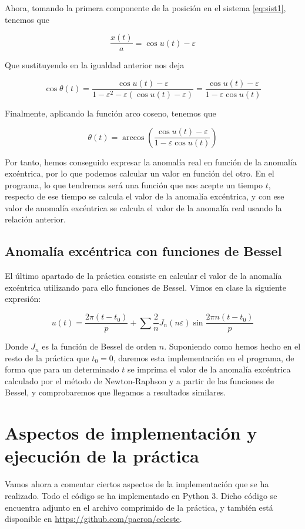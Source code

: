 \documentclass[12pt]{article}
\begin{document}
Ahora, tomando la primera componente de la posición en el sistema
\ref{eq:sist1}, tenemos que

\[
\frac{x(t)}{a} = \cos{u(t)} - \varepsilon
\]

Que sustituyendo en la igualdad anterior nos deja

\[
\cos{\theta(t)} = \frac{\cos{u(t)} - \varepsilon}{1 - \varepsilon^2 -
  \varepsilon(\cos{u(t)} - \varepsilon)} = \frac{\cos{u(t)} -
  \varepsilon}{1 - \varepsilon\cos{u(t)}}
\]

Finalmente, aplicando la función arco coseno, tenemos que

\[
\theta(t) = \arccos\left(\frac{\cos{u(t)} - \varepsilon}{1 -
    \varepsilon\cos{u(t)}}\right)
\]

Por tanto, hemos conseguido expresar la anomalía real en función
de la anomalía excéntrica, por lo que podemos calcular un valor
en función del otro. En el programa, lo que tendremos será una
función que nos acepte un tiempo $t$, respecto de ese tiempo se
calcula el valor de la anomalía excéntrica, y con ese valor de
anomalía excéntrica se calcula el valor de la anomalía real usando
la relación anterior.

\subsection{Anomalía excéntrica con funciones de Bessel}

El último apartado de la práctica consiste en calcular el valor de la
anomalía excéntrica utilizando para ello funciones de Bessel. Vimos
en clase la siguiente expresión:

\[
u(t) = \frac{2 \pi (t - t_0)}{p} + \sum \frac{2}{n} J_n(n\varepsilon)
\sin{\frac{2 \pi n(t - t_0)}{p}}
\]

Donde $J_n$ es la función de Bessel de orden $n$. Suponiendo como
hemos hecho en el resto de la práctica que $t_0 = 0$, daremos esta
implementación en el programa, de forma que para un determinado $t$ se
imprima el valor de la anomalía excéntrica calculado por el método
de Newton-Raphson y a partir de las funciones de Bessel, y comprobaremos
que llegamos a resultados similares.

\section{Aspectos de implementación y ejecución de la práctica}

Vamos ahora a comentar ciertos aspectos de la implementación que se ha
realizado. Todo el código se ha implementado en Python 3. Dicho código
se encuentra adjunto en el archivo comprimido de la práctica, y
también
está disponible en \url{https://github.com/pacron/celeste}.\\
\end{document}
